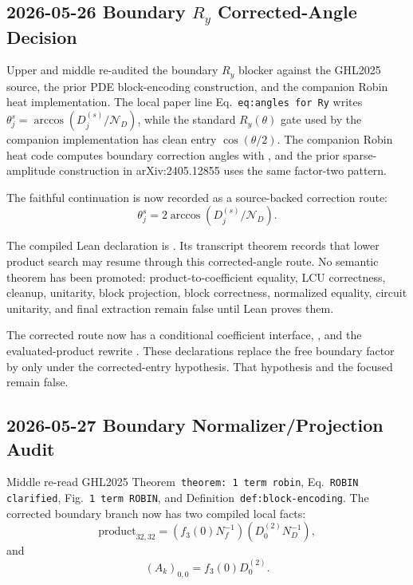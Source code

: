 \subsection{2026-05-26 Boundary \(R_y\) Corrected-Angle Decision}

Upper and middle re-audited the boundary \(R_y\) blocker against the GHL2025
source, the prior PDE block-encoding construction, and the companion Robin heat
implementation.  The local paper line Eq.~\texttt{eq:angles for Ry} writes
\(\theta_j^s=\arccos(D_j^{(s)}/\mathcal{N}_D)\), while the standard
\(R_y(\theta)\) gate used by the companion implementation has clean entry
\(\cos(\theta/2)\).  The companion Robin heat code computes boundary correction
angles with , and the prior sparse-amplitude
construction in arXiv:2405.12855 uses the same factor-two pattern.

The faithful continuation is now recorded as a source-backed correction route:
\[
  \theta_j^s = 2\arccos(D_j^{(s)}/\mathcal{N}_D).
\]

The compiled Lean declaration is
.
Its transcript theorem records that lower product search may resume through
this corrected-angle route.  No semantic theorem has been promoted:
product-to-coefficient equality, LCU correctness, cleanup, unitarity, block
projection, block correctness, normalized equality, circuit unitarity, and final
extraction remain false until Lean proves them.

The corrected route now has a conditional coefficient interface,
,
and the evaluated-product rewrite
.
These declarations replace the free boundary factor by
 only
under the corrected-entry hypothesis.  That hypothesis and the focused
 remain false.

\subsection{2026-05-27 Boundary Normalizer/Projection Audit}

Middle re-read GHL2025 Theorem~\texttt{theorem: 1 term robin},
Eq.~\texttt{ROBIN clarified}, Fig.~\texttt{1 term ROBIN}, and
Definition~\texttt{def:block-encoding}.  The corrected boundary branch now has
two compiled local facts:
\[
  \mathrm{product}_{32,32}
  =
  (f_3(0)N_f^{-1})(D_0^{(2)}N_D^{-1}),
\]
and
\[
  (A_k)_{0,0}=f_3(0)D_0^{(2)}.
\]

